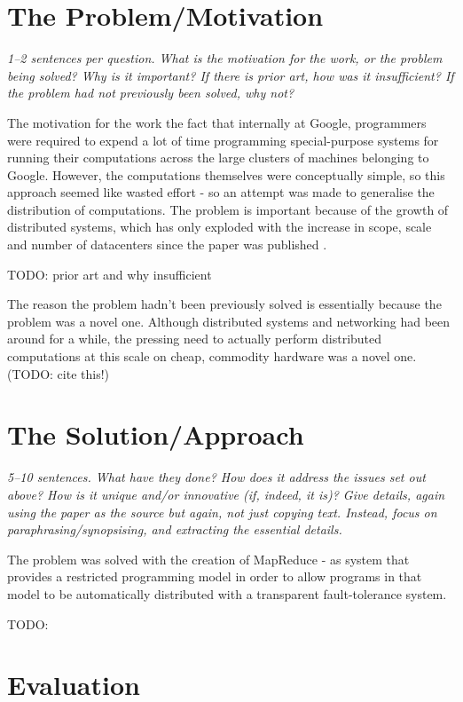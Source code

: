 \documentclass[11pt]{article}
\begin{document}
\section*{The Problem/Motivation}

\textsl{1--2 sentences per question. What is the motivation for the work, or
the problem being solved? Why is it important? If there is prior art, how was
it insufficient? If the problem had not previously been solved, why not?}

The motivation for the work the fact that internally at Google, programmers
were required to expend a lot of time programming special-purpose systems for
running their computations across the large clusters of machines belonging to
Google. However, the computations themselves were conceptually simple, so this
approach seemed like wasted effort - so an attempt was made to generalise the
distribution of computations. The problem is important because of the growth of
distributed systems, which has only exploded with the increase in scope, scale
and number of datacenters since the paper was published
\cite{VirtualizationGrowth}.

TODO: prior art and why insufficient

The reason the problem hadn't been previously solved is essentially because the
problem was a novel one. Although distributed systems and networking had been
around for a while, the pressing need to actually perform distributed
computations at this scale on cheap, commodity hardware was a novel one. (TODO:
cite this!)

\section*{The Solution/Approach}

\textsl{5--10 sentences. What have they done? How does it address the issues
set out above? How is it unique and/or innovative (if, indeed, it is)? Give
details, again using the paper as the source but again, not just copying text.
Instead, focus on paraphrasing/synopsising, and extracting the essential
details.}

The problem was solved with the creation of MapReduce - as system that provides
a restricted programming model in order to allow programs in that model to be
automatically distributed with a transparent fault-tolerance system.

TODO:

\section*{Evaluation}
\end{document}
